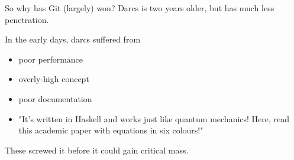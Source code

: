 \documentclass[pdf]{prosper}
\begin{document}



\begin{slide}{So why has Git (largely) won?}
Darcs is two years older, but has much less penetration.

In the early days, darcs suffered from
\begin{itemize}
\item poor performance
\item overly-high concept
\item poor documentation
\item "It's written in Haskell and works just like quantum mechanics! Here,
read this academic paper with equations in six colours!"
\end{itemize}
These screwed it before it could gain critical mass.
\end{slide}
\end{document}
